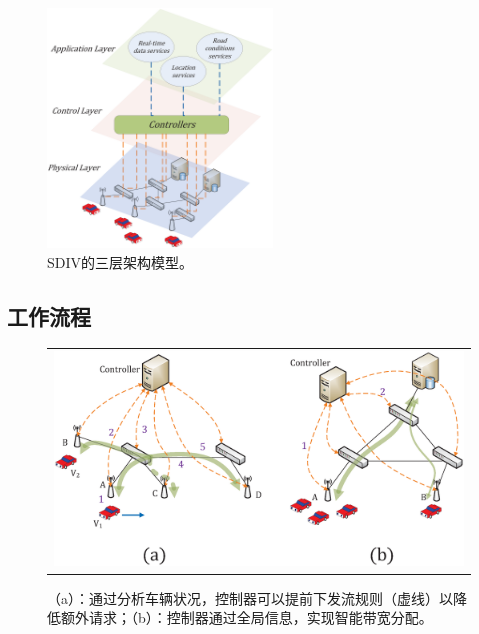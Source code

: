 \begin{figure} [t]
\begin{center}
\includegraphics[width=0.9\columnwidth,height=2.5in]{figures/fig-2-24.eps}
\caption{SDIV的三层架构模型。} \label{fig2}
\end{center}
\end{figure}

\subsection{工作流程}





\begin{figure} [t]
\begin{center}
\begin{tabular}{c}
\includegraphics[width=1\columnwidth]{figures/fig-3-29.eps} \\
\end{tabular}
\caption{（a）：通过分析车辆状况，控制器可以提前下发流规则（虚线）以降低额外请求；（b）：控制器通过全局信息，实现智能带宽分配。} \label{fig3}
  \end{center}
\end{figure}

